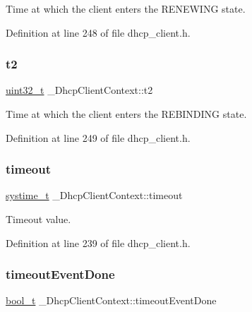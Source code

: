 Time at which the client enters the R\+E\+N\+E\+W\+I\+NG state. 



Definition at line 248 of file dhcp\+\_\+client.\+h.

\mbox{\label{struct__DhcpClientContext_a733de356e46bb2553d97c81b8f8c7a5f}} 
\subsubsection{\texorpdfstring{t2}{t2}}
{\footnotesize\ttfamily \hyperlink{stdint_8h_a435d1572bf3f880d55459d9805097f62}{uint32\+\_\+t} \+\_\+\+Dhcp\+Client\+Context\+::t2}



Time at which the client enters the R\+E\+B\+I\+N\+D\+I\+NG state. 



Definition at line 249 of file dhcp\+\_\+client.\+h.

\mbox{\label{struct__DhcpClientContext_af15562d591ed84863a22639bab13f12c}} 
\subsubsection{\texorpdfstring{timeout}{timeout}}
{\footnotesize\ttfamily \hyperlink{compiler__port_8h_ae3e32a98d431a02106616da3071832dd}{systime\+\_\+t} \+\_\+\+Dhcp\+Client\+Context\+::timeout}



Timeout value. 



Definition at line 239 of file dhcp\+\_\+client.\+h.

\mbox{\label{struct__DhcpClientContext_ac1afec285507858d425b2643cf9c5d79}} 
\subsubsection{\texorpdfstring{timeout\+Event\+Done}{timeoutEventDone}}
{\footnotesize\ttfamily \hyperlink{compiler__port_8h_a812d16e5494522586b3784e55d479912}{bool\+\_\+t} \+\_\+\+Dhcp\+Client\+Context\+::timeout\+Event\+Done}



